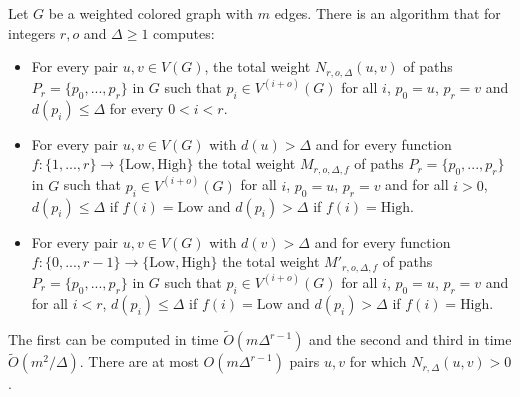\documentclass[a4paper,UKenglish,cleveref, autoref, numberwithinsect, thm-restate]{lipics-v2021}
\begin{document}
	\begin{lemma} \label{lem:aux_cycle}
		Let $G$ be a weighted colored graph with $m$ edges. There is an algorithm that for integers $r, o$ and $\Delta \geq 1$ computes:
		\begin{itemize}
			\item For every pair $u,v \in V(G)$, the total weight $N_{r,o,\Delta}(u,v)$ of paths $P_r =\{p_0,...,p_{r}\}$ in $G$ such that $p_i \in V^{(i+o)}(G)$ for all $i$, $p_0 = u$, $p_{r} = v$ and $d(p_i) \leq \Delta$ for every $0 < i < r$.
			\item For every pair $u,v \in V(G)$ with $d(u) > \Delta$ and for every function $f: \{1,...,r\} \to \{\text{Low},\text{High}\}$ the total weight $M_{r,o,\Delta,f}$ of paths $P_r =\{p_0,...,p_r\}$ in $G$ such that $p_i \in V^{(i+o)}(G)$ for all $i$, $p_0 = u$, $p_{r} = v$ and for all $i>0$, $d(p_i) \leq \Delta$ if $f(i) =\text{Low}$ and $d(p_i) > \Delta$ if $f(i) =\text{High}$.
			\item For every pair $u,v \in V(G)$ with $d(v) > \Delta$ and for every function $f: \{0,...,r-1\} \to \{\text{Low},\text{High}\}$ the total weight $M'_{r,o,\Delta,f}$ of paths $P_r =\{p_0,...,p_r\}$ in $G$ such that $p_i \in V^{(i+o)}(G)$ for all $i$, $p_0 = u$, $p_{r} = v$ and for all $i<r$, $d(p_i) \leq \Delta$ if $f(i) =\text{Low}$ and $d(p_i) > \Delta$ if $f(i) =\text{High}$.
		\end{itemize}
		The first can be computed in time $\tilde{O}(m\Delta^{r-1})$ and the second and third in time $\tilde{O}(m^2/\Delta)$. There are at most $O(m\Delta^{r-1})$ pairs $u,v$ for which $N_{r,\Delta}(u,v) > 0$.
	\end{lemma}
\end{document}
